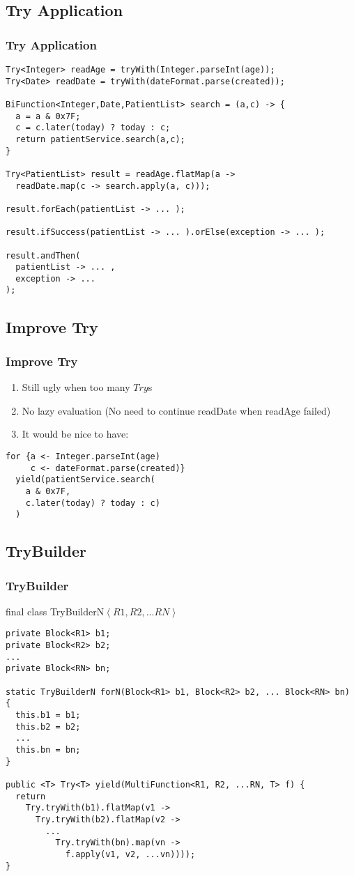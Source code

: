 \documentclass{beamer}
\begin{document}
\subsection{Try Application}
\begin{frame}[fragile]
  \frametitle{Try Application}
  \scriptsize{
  \begin{verbatim}
Try<Integer> readAge = tryWith(Integer.parseInt(age));
Try<Date> readDate = tryWith(dateFormat.parse(created));

BiFunction<Integer,Date,PatientList> search = (a,c) -> {
  a = a & 0x7F;
  c = c.later(today) ? today : c;
  return patientService.search(a,c);
}

Try<PatientList> result = readAge.flatMap(a ->
  readDate.map(c -> search.apply(a, c)));

result.forEach(patientList -> ... );

result.ifSuccess(patientList -> ... ).orElse(exception -> ... );

result.andThen(
  patientList -> ... ,
  exception -> ... 
);
  \end{verbatim}
  }
\end{frame}

\subsection{Improve Try}
\begin{frame}[fragile]
  \frametitle{Improve Try}
    \begin{enumerate}
    \item Still ugly when too many $Try$s
    \item No lazy evaluation (No need to continue readDate when readAge failed)
    \item It would be nice to have:
    \end{enumerate}
  \scriptsize{
  \begin{verbatim}
for {a <- Integer.parseInt(age)
     c <- dateFormat.parse(created)} 
  yield(patientService.search(
    a & 0x7F, 
    c.later(today) ? today : c)
  )
  \end{verbatim}
  }
\end{frame}

\subsection{TryBuilder}
\begin{frame}[fragile]
  \frametitle{TryBuilder}
  final class TryBuilderN$\left <R1,R2,...RN \right>$
  \scriptsize{
  \begin{verbatim}
private Block<R1> b1;
private Block<R2> b2;
...
private Block<RN> bn;

static TryBuilderN forN(Block<R1> b1, Block<R2> b2, ... Block<RN> bn) {
  this.b1 = b1;
  this.b2 = b2;
  ...
  this.bn = bn;
}

public <T> Try<T> yield(MultiFunction<R1, R2, ...RN, T> f) {
  return
    Try.tryWith(b1).flatMap(v1 ->
      Try.tryWith(b2).flatMap(v2 ->
        ...
          Try.tryWith(bn).map(vn ->
            f.apply(v1, v2, ...vn))));
}
  \end{verbatim}
  }
\end{frame}
\end{document}
